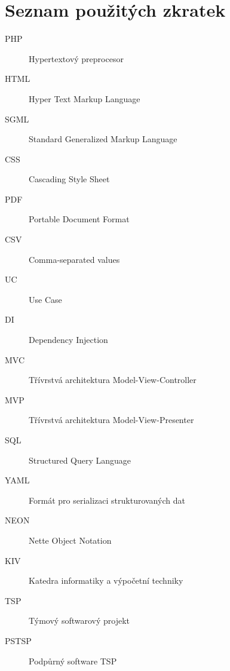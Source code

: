\documentclass[czech,BP]{thesiskiv}
\begin{document}
\chapter*{Seznam použitých zkratek}
\begin{description}
	\item[PHP] Hypertextový preprocesor
	\item[HTML] Hyper Text Markup Language
	\item[SGML] Standard Generalized Markup Language
	\item[CSS] Cascading Style Sheet
	\item[PDF] Portable Document Format
	\item[CSV] Comma-separated values
	\item[UC] Use Case
	\item[DI] Dependency Injection
	\item[MVC] Třívrstvá architektura Model-View-Controller
	\item[MVP] Třívrstvá architektura Model-View-Presenter
	\item[SQL] Structured Query Language
	\item[YAML] Formát pro serializaci strukturovaných dat
	\item[NEON] Nette Object Notation
	\item[KIV] Katedra informatiky a výpočetní techniky
	\item[TSP] Týmový softwarový projekt
	\item[PSTSP] Podpůrný software TSP
\end{description}
%

\end{document}
